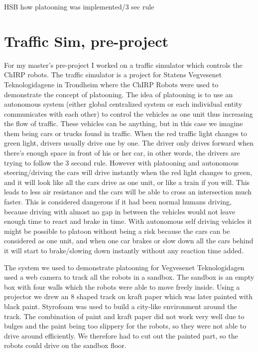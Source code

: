 HSB
how platooning was implemented/3 sec rule

\section{Traffic Sim, pre-project}
For my master's pre-project I worked on a traffic simulator which controls the ChIRP robots.
The traffic simulator is a project for Statens Vegvesenet Teknologidagene in Trondheim where the ChIRP Robots were used to demonstrate the concept of platooning. 
The idea of platooning is to use an autonomous system (either global centralized system or each individual entity communicates with each other) to control the vehicles as one unit thus increasing the flow of traffic. These vehicles can be anything, but in this case we imagine them being cars or trucks found in traffic. When the red traffic light changes to green light, drivers usually drive one by one. The driver only drives forward when there's enough space in front of his or her car, in other words, the drivers are trying to follow the 3 second rule.
However with platooning and autonomous steering/driving the cars will drive instantly when the red light changes to green, and it will look like all the cars drive as one unit, or like a train if you will.
This leads to less air resistance and the cars will be able to cross an intersection much faster. This is considered dangerous if it had been normal humans driving, because driving with almost no gap in between the vehicles would not leave enough time to react and brake in time. With autonomous self driving vehicles it might be possible to platoon without being a risk because the cars can be considered as one unit, and when one car brakes or slow down all the cars behind it will start to brake/slowing down instantly without any reaction time added.

The system we used to demonstrate platooning for Vegvesenet Teknologidagen used a web camera to track all the robots in a sandbox. The sandbox is an empty box with four walls which the robots were able to move freely inside. Using a projector we drew an 8 shaped track on kraft paper which was later painted with black paint. Styrofoam was used to build a city-like environment around the track.
The combination of paint and kraft paper did not work very well due to bulges and the paint being too slippery for the robots, so they were not able to drive around efficiently. We therefore had to cut out the painted part, so the robots could drive on the sandbox floor.

